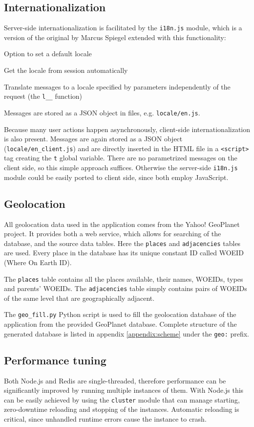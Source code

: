 \documentclass[12pt,oneside]{fithesis}
\begin{document}
	\subsection{Internationalization}
		Server-side internationalization is facilitated by the \texttt{i18n.js} module, which is a version of the original by Marcus Spiegel extended with this functionality:
		\begin{compactitem}
			\item Option to set a default locale
			\item Get the locale from session automatically
			\item Translate messages to a locale specified by parameters independently of the request (the \texttt{l\_\_} function)
		\end{compactitem}
		Messages are stored as a JSON object in files, e.g. \texttt{locale/en.js}.
		
		Because many user actions happen asynchronously, client-side internationalization is also present. Messages are again stored as a JSON object (\texttt{locale/en\_client.js}) and are directly inserted in the HTML file in a \texttt{<script>} tag creating the \texttt{t} global variable. There are no parametrized messages on the client side, so this simple approach suffices. Otherwise the server-side \texttt{i18n.js} module could be easily ported to client side, since both employ JavaScript.
	\subsection{Geolocation}
	\label{section:geo}
		All geolocation data used in the application comes from the Yahoo! GeoPlanet project. \cite{website:geoplanet} It provides both a web service, which allows for searching of the database, and the source data tables. Here the \texttt{places} and \texttt{adjacencies} tables are used. Every place in the database has its unique constant ID called WOEID (Where On Earth ID). 
		
		The \texttt{places} table contains all the places available, their names, WOEIDs, types and parents' WOEIDs. The \texttt{adjacencies} table simply contains pairs of WOEIDs of the same level that are geographically adjacent.
		
		The \texttt{geo\_fill.py} Python script is used to fill the geolocation database of the application from the provided GeoPlanet database. Complete structure of the generated database is listed in appendix \ref{appendix:scheme} under the \texttt{geo:} prefix.
	\subsection{Performance tuning}
		Both Node.js and Redis are single-threaded, therefore performance can be significantly improved by running multiple instances of them. With Node.js this can be easily achieved by using the \texttt{cluster} module that can manage starting, zero-downtime reloading and stopping of the instances. Automatic reloading is critical, since unhandled runtime errors cause the instance to crash.
		
\end{document}
